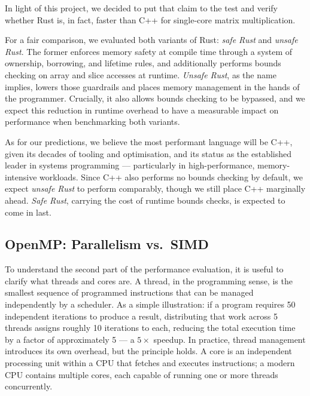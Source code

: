 \documentclass[12pt,a4paper]{article}
\begin{document}
In light of this project, we decided to put that claim to the test and verify
whether Rust is, in fact, faster than C++ for single-core matrix
multiplication.

For a fair comparison, we evaluated both variants of Rust: \textit{safe Rust}
and \textit{unsafe Rust}. The former enforces memory safety at compile time
through a system of ownership, borrowing, and lifetime rules, and additionally
performs bounds checking on array and slice accesses at runtime.
\textit{Unsafe Rust}, as the name implies, lowers those guardrails and places
memory management in the hands of the programmer. Crucially, it also allows
bounds checking to be bypassed, and we expect this reduction in runtime
overhead to have a measurable impact on performance when benchmarking both
variants.

As for our predictions, we believe the most performant language will be C++,
given its decades of tooling and optimisation, and its status as the
established leader in systems programming --- particularly in
high-performance, memory-intensive workloads. Since C++ also performs no
bounds checking by default, we expect \textit{unsafe Rust} to perform
comparably, though we still place C++ marginally ahead. \textit{Safe Rust},
carrying the cost of runtime bounds checks, is expected to come in last.

\subsection{OpenMP: Parallelism vs.\ SIMD}
\label{sec:openmp-parallelism-vs-simd}

To understand the second part of the performance evaluation, it is useful to
clarify what threads and cores are. A thread, in the programming
sense, is the smallest sequence of programmed instructions that can be managed
independently by a scheduler. As a simple illustration: if a program requires
50 independent iterations to produce a result, distributing that work across 5
threads assigns roughly 10 iterations to each, reducing the total execution
time by a factor of approximately 5 --- a $5\times$ speedup. In practice,
thread management introduces its own overhead, but the principle holds. A
core is an independent processing unit within a CPU that fetches and
executes instructions; a modern CPU contains multiple cores, each capable of
running one or more threads concurrently.
\end{document}

